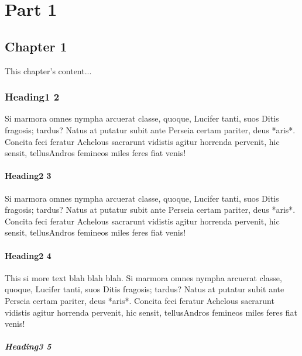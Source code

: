 \part{Part 1}

\chapter{Chapter 1}

This chapter's content...

\section{Heading1 2}

Si marmora omnes nympha arcuerat classe, quoque, Lucifer tanti, suos Ditis
fragosis; tardus? Natus at putatur subit ante Perseia certam pariter, deus
*aris*. Concita feci feratur Achelous sacrarunt vidistis agitur horrenda
pervenit, hic sensit, tellusAndros femineos miles feres fiat venis!

\subsection{Heading2 3}

Si marmora omnes nympha arcuerat classe, quoque, Lucifer tanti, suos Ditis
fragosis; tardus? Natus at putatur subit ante Perseia certam pariter, deus
*aris*. Concita feci feratur Achelous sacrarunt vidistis agitur horrenda
pervenit, hic sensit, tellusAndros femineos miles feres fiat venis!


\subsection{Heading2 4}

This si more text blah blah blah.
Si marmora omnes nympha arcuerat classe, quoque, Lucifer tanti, suos Ditis
fragosis; tardus? Natus at putatur subit ante Perseia certam pariter, deus
*aris*. Concita feci feratur Achelous sacrarunt vidistis agitur horrenda
pervenit, hic sensit, tellusAndros femineos miles feres fiat venis!

\subsubsection{Heading3 5}

